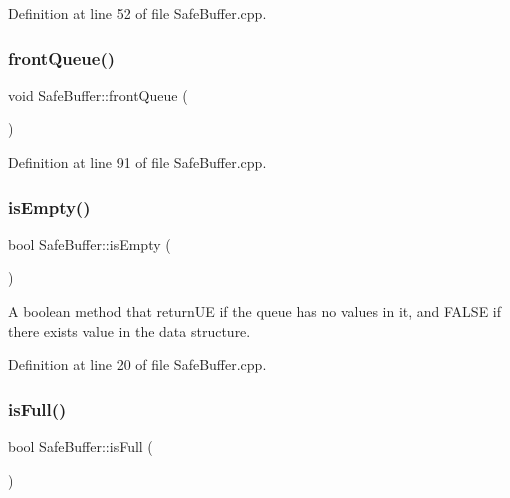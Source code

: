 Definition at line 52 of file Safe\+Buffer.\+cpp.

\mbox{\label{classSafeBuffer_a86fe7b908e03bad1b234d4bb4d0919c3}} 
\subsubsection{\texorpdfstring{front\+Queue()}{frontQueue()}}
{\footnotesize\ttfamily void Safe\+Buffer\+::front\+Queue (\begin{DoxyParamCaption}{ }\end{DoxyParamCaption})}



Definition at line 91 of file Safe\+Buffer.\+cpp.

\mbox{\label{classSafeBuffer_a0caf19dab729df52404c0f13aaf36ddc}} 
\subsubsection{\texorpdfstring{is\+Empty()}{isEmpty()}}
{\footnotesize\ttfamily bool Safe\+Buffer\+::is\+Empty (\begin{DoxyParamCaption}{ }\end{DoxyParamCaption})}



A boolean method that return\+UE if the queue has no values in it, and F\+A\+L\+SE if there exists value in the data structure. 



Definition at line 20 of file Safe\+Buffer.\+cpp.

\mbox{\label{classSafeBuffer_ac383f154f080685aa2aef3c66771c585}} 
\subsubsection{\texorpdfstring{is\+Full()}{isFull()}}
{\footnotesize\ttfamily bool Safe\+Buffer\+::is\+Full (\begin{DoxyParamCaption}{ }\end{DoxyParamCaption})}



